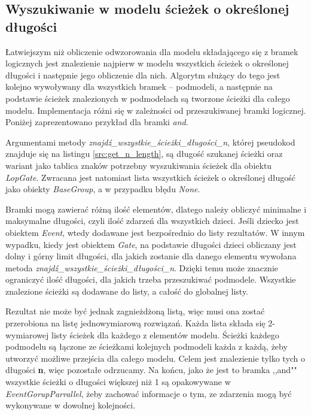 \subsection{Wyszukiwanie w modelu ścieżek o określonej długości}

Łatwiejszym niż obliczenie odwzorowania dla modelu składającego się z bramek logicznych jest znalezienie najpierw w modelu wszystkich ścieżek o określonej długości i następnie jego obliczenie dla nich. Algorytm służący do tego jest kolejno wywoływany dla wszystkich bramek -- podmodeli, a następnie na podstawie ścieżek znalezionych w podmodelach są tworzone ścieżki dla całego modelu. Implementacja różni się w zależności od przeszukiwanej bramki logicznej. Poniżej zaprezentowano przykład dla bramki \textit{and}.  

Argumentami metody \textit{znajdź{\_}wszystkie{\_}ścieżki{\_}długości{\_}n}, której pseudokod znajduje się na listingu \ref{src:get_n_length}, są długość szukanej ścieżki oraz wariant jako tablica znaków potrzebny wyszukiwania ścieżek dla obiektu \textit{LopGate}. Zwracana jest natomiast lista wszystkich ścieżek o określonej długość jako obiekty \textit{BaseGroup}, a w przypadku błędu \textit{None}.

Bramki mogą zawierać różną ilość elementów, dlatego należy obliczyć minimalne i maksymalne długości, czyli ilość zdarzeń dla wszystkich dzieci. Jeśli dziecko jest obiektem \textit{Event}, wtedy dodawane jest bezpośrednio do listy rezultatów. W innym wypadku, kiedy jest obiektem \textit{Gate}, na podstawie długości dzieci obliczany jest dolny i górny limit długości, dla jakich zostanie dla danego elementu wywołana metoda \textit{znajdź{\_}wszystkie{\_}ścieżki{\_}długości{\_}n}. Dzięki temu może znacznie ograniczyć ilość długości, dla jakich trzeba przeszukiwać podmodele. Wszystkie znalezione ścieżki są dodawane do listy, a całość do globalnej listy. 

Rezultat nie może być jednak zagnieżdżoną listą, więc musi ona zostać przerobiona na listę jednowymiarową rozwiązań. Każda lista składa się 2-wymiarowej listy ścieżek dla każdego z elementów modelu. Ścieżki każdego podmodelu są łączone ze ścieżkami kolejnych podmodeli każda z każdą, żeby utworzyć możliwe przejścia dla całego modelu. Celem jest znalezienie tylko tych o długości \textbf{n}, więc pozostałe odrzucamy. Na końcu, jako że jest to bramka ,,and"" wszystkie ścieżki o długości większej niż 1 są opakowywane w \textit{EventGorupParrallel}, żeby zachować informacje o tym, ze zdarzenia mogą być wykonywane w dowolnej kolejności.

